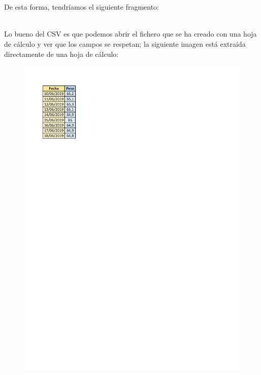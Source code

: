\documentclass[11pt, oneside]{book}		%
\begin{document}
	\\\\\begin{minipage}[c]{0.95\textwidth}
		
	\end{minipage}
	De esta forma, tendríamos el siguiente fragmento:
	\\\\\begin{minipage}[c]{0.95\textwidth}
		
	\end{minipage}
	Lo bueno del CSV es que podemos abrir el fichero que se ha creado con una hoja de cálculo y ver que los campos se respetan; la siguiente imagen está extraída directamente de una hoja de cálculo:
	\begin{figure}[H]
		\centering
		\includegraphics{img/ManejoDeFicherosYDirectorios/MisPesos.pdf}
	\end{figure}
\end{document}
